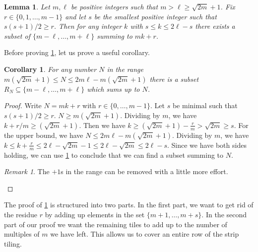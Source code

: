 \documentclass[11pt, reqno, psamsfonts]{amsart}
\theoremstyle{plain}
\newtheorem{lemma}[theorem]{Lemma}
\newtheorem{corollary}[theorem]{Corollary}
\theoremstyle{definition}
\theoremstyle{remark}
\newtheorem*{remark*}{Remark}
\begin{document}
\begin{lemma}\label{lem:subset}
Let $m, \ell$ be positive integers such that $m > \ell \geq \sqrt{2m}+1$. Fix $r \in \{0, 1, \ldots, m-1\}$ and let $s$ be the smallest positive integer such that $s(s + 1)/2 \geq r$. Then for any integer $k$ with $s \leq k \leq 2\ell - s$ there exists a subset of $\{m-\ell, \ldots, m+\ell\}$ summing to $mk+r$.
\end{lemma}
Before proving \cref{lem:subset}, let us prove a useful corollary.
\begin{corollary}\label{cor:range}
 For any number $N$ in the range $m(\sqrt{2m}+1) \leq N \leq 2m\ell - m(\sqrt{2m}+1)$ there is a subset $R_N \subseteq \{m - \ell, \ldots, m + \ell\}$ which sums up to $N$.    
\end{corollary}

\begin{proof}
    Write $N=mk+r$ with $r \in \{0,\ldots,m-1\}$. Let $s$ be minimal such that $s(s + 1)/2 \geq r$. $N\geq m(\sqrt{2m}+1)$. Dividing by $m$, we have $k+r/m\geq (\sqrt{2m}+1)$. Then we have $k\geq  (\sqrt{2m}+1)-\frac{r}{m} >  \sqrt{2m}\geq s$.
    For the upper bound, we have $N\leq 2m\ell - m(\sqrt{2m}+1)$. Dividing by $m$, we have $k\leq k+\frac{r}{m} \leq 2\ell-\sqrt{2m}-1\leq 2\ell-\sqrt{2m}\leq 2\ell-s$. Since we have both sides holding, we can use \cref{lem:subset} to conclude that we can find a subset summing to $N$. 
\begin{remark*}
The $+1$s in the range can be removed with a little more effort.
\end{remark*}
\end{proof}
The proof of \cref{lem:subset} is structured into two parts. In the first part, we want to get rid of the residue $r$ by adding up elements in the set $\{m + 1, \ldots, m + s\}$. In the second part of our proof we want the remaining tiles to add up to the number of multiples of $m$ we have left. This allows us to cover an entire row of the strip tiling.
\end{document}
